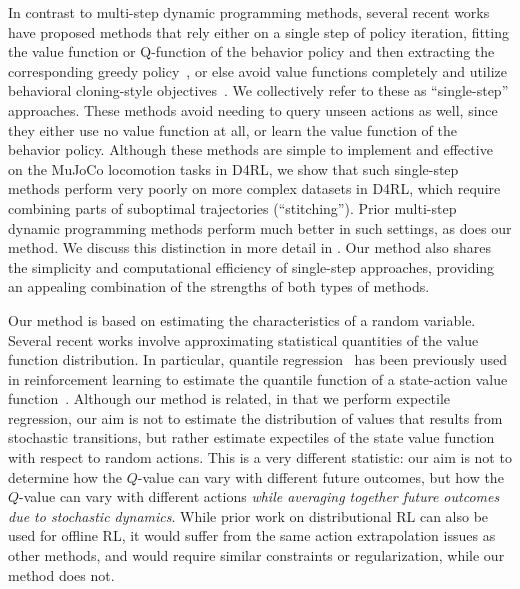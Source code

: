 \documentclass{article} %
\begin{document}
In contrast to multi-step dynamic programming methods, several recent works have proposed methods that rely either on a single step of policy iteration, fitting the value function or Q-function of the behavior policy and then extracting the corresponding greedy policy~\citep{peng2019advantage,brandfonbrener2021offline,gulcehre2021regularized}, or else avoid value functions completely and utilize behavioral cloning-style objectives~\citep{chen2021decision}. We collectively refer to these as ``single-step''
approaches. These methods avoid needing to query unseen actions as well, since they either use no value function at all, or learn the value function of the behavior policy. Although these methods are simple to implement and effective on the MuJoCo locomotion tasks in D4RL, we show that such single-step methods perform very poorly on more complex datasets in D4RL, which require combining parts of suboptimal trajectories (``stitching''). Prior multi-step dynamic programming methods perform much better in such settings, as does our method. We discuss this distinction in more detail in . Our method also shares the simplicity and computational efficiency of single-step approaches, providing an appealing combination of the strengths of both types of methods.

Our method is based on estimating the characteristics of a random variable. Several recent works involve approximating statistical quantities of the value function distribution. In particular, quantile regression~\citep{koenker2001quantile} has been previously used in reinforcement learning to estimate the quantile function of a state-action value function~\citep{dabney2018distributional, dabney2018implicit,kuznetsov2020controlling}.
Although our method is related, in that we perform expectile regression, our aim is not to estimate the distribution of values that results from stochastic transitions, but rather estimate expectiles of the state value function with respect to random actions.
This is a very different statistic: our aim is not to determine how the $Q$-value can vary with different future outcomes, but how the $Q$-value can vary with different actions \emph{while averaging together future outcomes due to stochastic dynamics}. While prior work on distributional RL can also be used for offline RL, it would suffer from the same action extrapolation issues as other methods, and would require similar constraints or regularization, while our method does not.
\end{document}
